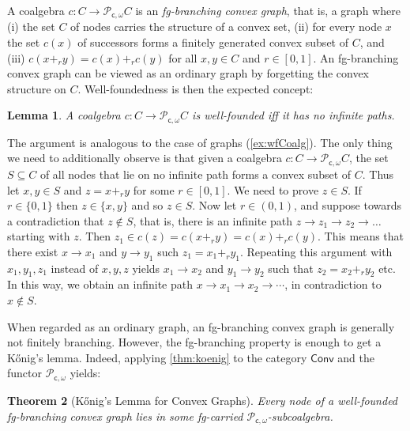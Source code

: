 \documentclass[10pt,a4paper]{article}
\newtheorem{theorem}{Theorem}[section]
\newtheorem{lemma}[theorem]{Lemma}
\theoremstyle{definition}
\theoremstyle{remark}
\numberwithin{equation}{section}
\providecommand{\catname}{\mathsf}
\def\Conv{\catname{Conv}}
\newcommand{\Konig}{Kőnig}
\newcommand{\Pow}{\mathcal{P}}
\newcommand{\seq}{\subseteq}
\newcommand{\CPowf}{\Pow_{\mathsf{c},\omega}}
\newenvironment{proofhere}[2][Proof of]{    \proof{#1~\autoref{#2}}    }{  \endproof  \par}
\newenvironment{proofappendix}[2][Proof of]{    \begin{proofhere}[#1]{#2}\label{#2:proof}
  }{    \end{proofhere}
  }
\theoremstyle{plain}
\theoremstyle{definition}
\begin{document}
A coalgebra $c\colon C\to \CPowf C$ is an \emph{fg-branching convex graph}, that is, a graph where (i) the set $C$ of nodes carries the structure of a convex set, (ii) for every node $x$ the set $c(x)$ of successors forms a finitely generated convex subset of $C$, and (iii) $c(x+_r y)=c(x)+_r c(y)$ for all $x,y\in C$ and $r\in [0,1]$. An fg-branching convex graph can be viewed as an ordinary graph by forgetting the convex structure on $C$. Well-foundedness is then the expected concept:

\begin{lemma}\label{lem:convex-well-founded}
A coalgebra $c\colon C\to \CPowf C$ is well-founded iff it has no infinite paths.
\end{lemma}

\begin{proofappendix}{lem:convex-well-founded}
The argument is analogous to the case of graphs (\autoref{ex:wfCoalg}). The only thing we need to additionally observe is that given a coalgebra $c\colon C\to \CPowf C$, the set $S\seq C$ of all nodes that lie on no infinite path forms a convex subset of $C$. Thus let $x,y\in S$ and $z=x+_r y$ for some $r\in [0,1]$. We need to prove $z\in S$. If $r\in \{0,1\}$ then $z\in \{x,y\}$ and so $z\in S$. Now let $r\in (0,1)$, and suppose towards a contradiction that $z\not\in S$, that is, there is an infinite path $z\to z_1 \to z_2\to\ldots$ starting with $z$. Then $z_1\in c(z)=c(x+_r y) = c(x)+_r c(y)$. This means that there exist $x\to x_1$ and $y\to y_1$ such $z_1=x_1+_r y_1$. Repeating this argument with $x_1,y_1,z_1$ instead of $x,y,z$ yields $x_1\to x_2$ and $y_1\to y_2$ such that $z_2=x_2+_r y_2$ etc. In this way, we obtain an infinite path $x\to x_1\to x_2\to \cdots$, in  contradiction to $x\not\in S$.    
\end{proofappendix}



When regarded as an ordinary graph, an fg-branching convex graph is generally not finitely branching. However, the fg-branching property is enough to get a \Konig's lemma. Indeed, applying \autoref{thm:koenig} to the category $\Conv$ and the functor $\CPowf$ yields:

\begin{theorem}[\Konig's Lemma for Convex Graphs]\label{thm:koenig-convex}
Every node of a well-founded fg-branching convex graph lies in some fg-carried $\CPowf$-subcoalgebra.
\end{theorem}
\end{document}
